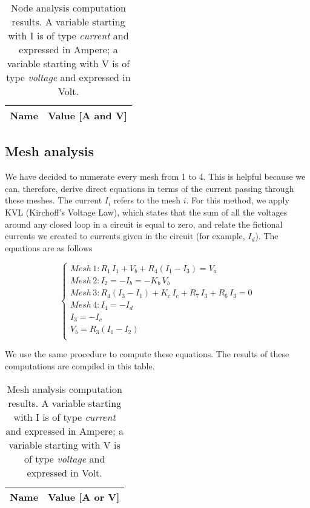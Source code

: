 \begin{table}[h]
  \centering
  \begin{tabular}{|l|r|}
    \hline    
    {\bf Name} & {\bf Value [A and V]} \\ \hline
    
  \end{tabular}
  \caption{Node analysis computation results. A variable starting with I is of type {\em current}
    and expressed in Ampere; a variable starting with V is of type {\it voltage} and expressed in
    Volt.}
  \label{tab:op}
\end{table}

\subsection{Mesh analysis}

We have decided to numerate every mesh from 1 to 4. This is helpful because we can, therefore, derive direct equations in terms of the current passing through these meshes. The current $I_i$ refers to the mesh $i$. For this method, we apply KVL (Kirchoff's Voltage Law), which states that the sum of all the voltages around any closed loop in a circuit is equal to zero, and relate the fictional currents we created to currents given in the circuit (for example, $I_d$). The equations are as follows

\begin{equation} 
\begin{cases}  
    Mesh\, 1: R_1\,I_1 + V_b + R_4(I_1 - I_3) = V_a \\
    Mesh\, 2: I_2 = -I_b = -K_b\, V_b\\
    Mesh\, 3: R_4(I_3 - I_1) + K_c\,I_c + R_7\,I_3 + R_6\,I_3 = 0 \\
    Mesh\, 4: I_4 = -I_d \\
    I_3 = -I_c \\
    V_b = R_3(I_1 - I_2) \\
    
    
\end{cases}
\label{eq:2}
\end{equation}

We use the same procedure to compute these equations. The results of these computations are compiled in this table.

\begin{table}[h]
  \centering
  \begin{tabular}{|l|r|}
    \hline    
    {\bf Name} & {\bf Value [A or V]} \\ \hline
    
  \end{tabular}
  \caption{Mesh analysis computation results. A variable starting with I is of type {\em current}
    and expressed in Ampere; a variable starting with V is of type {\it voltage} and expressed in
    Volt.}
  \label{tab:op}
\end{table}

